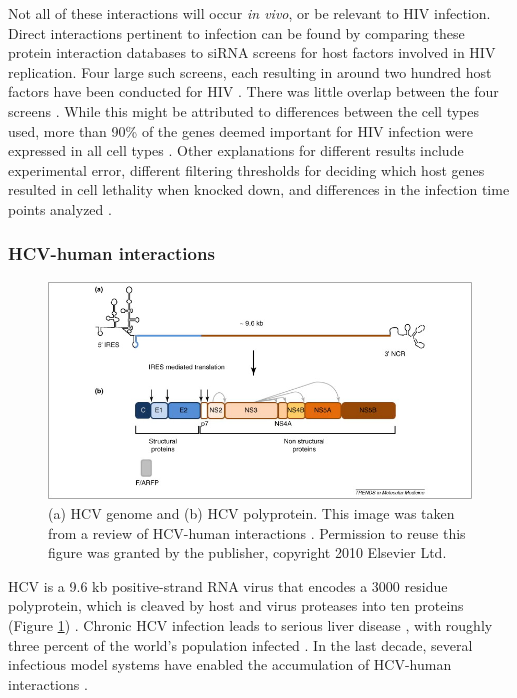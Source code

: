 Not all of these interactions will occur \textit{in vivo}, or be
relevant to HIV infection. Direct interactions pertinent to infection
can be found by comparing these protein interaction databases to siRNA
screens for host factors involved in HIV replication. Four large such
screens, each resulting in around two hundred host factors have been
conducted for HIV \cite{zhou08, konig08, brass08, yeung09}. There was
little overlap between the four screens \cite{yeung09,
  bushman09}. While this might be attributed to differences between
the cell types used, more than 90\% of the genes deemed important for
HIV infection were expressed in all cell types \cite{bushman09}. Other
explanations for different results include experimental error,
different filtering thresholds for deciding which host genes resulted
in cell lethality when knocked down, and differences in the infection
time points analyzed \cite{bushman09}.


\subsubsection{HCV-human interactions}

\begin{figure}
\begin{center}
\includegraphics[scale=0.75]{figs/hcv_proteins}
\end{center}
\caption[HCV genome]{\small (a) HCV genome and (b) HCV
  polyprotein. This image was taken from a review of HCV-human
  interactions \cite{georgel2010virus}. Permission to reuse this
  figure was granted by the publisher, copyright 2010 Elsevier
  Ltd. \label{fig:hcv_proteins}}
\end{figure}

HCV is a 9.6 kb positive-strand RNA virus that encodes a 3000 residue
polyprotein, which is cleaved by host and virus proteases into ten
proteins (Figure \ref{fig:hcv_proteins})
\cite{moradpour2007replication}. Chronic HCV infection leads to
serious liver disease \cite{georgel2010virus}, with roughly three
percent of the world's population infected
\cite{shepard2005global}. In the last decade, several infectious model
systems have enabled the accumulation of HCV-human interactions
\cite{georgel2010virus}.

